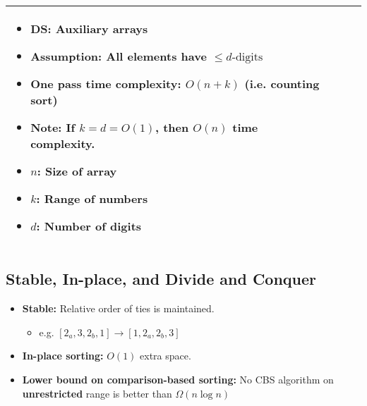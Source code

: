 \begin{summary}
\begin{center}
\begin{tabular}{lccc}
{\begin{itemize}
            \item \textbf{DS:} Auxiliary arrays
            \item \textbf{Assumption:} All elements have $\leq d\text{-digits}$
            \item \textbf{One pass time complexity:} $O(n+k)$ (i.e. counting sort)
            \item \textbf{Note:} If $k=d=O(1)$, then $O(n)$ time complexity.
            \item $n$: Size of array
            \item $k$: Range of numbers
            \item $d$: Number of digits
        \end{itemize}} \\
        \bottomrule
        \end{tabular}
    \end{center}
\end{summary}
\newpage

\subsection{Stable, In-place, and Divide and Conquer}
\begin{definition}
    \begin{itemize}
        \item \textbf{Stable:} Relative order of ties is maintained.
        \begin{itemize}
            \item e.g. $[2_a,3,2_b,1]\rightarrow [1,2_a,2_b,3]$
        \end{itemize}
        \item \textbf{In-place sorting:} $O(1)$ extra space.
        \item \textbf{Lower bound on comparison-based sorting:} No CBS algorithm on \textbf{unrestricted} range is better than $\Omega(n \log n)$
    \end{itemize}
\end{definition}

